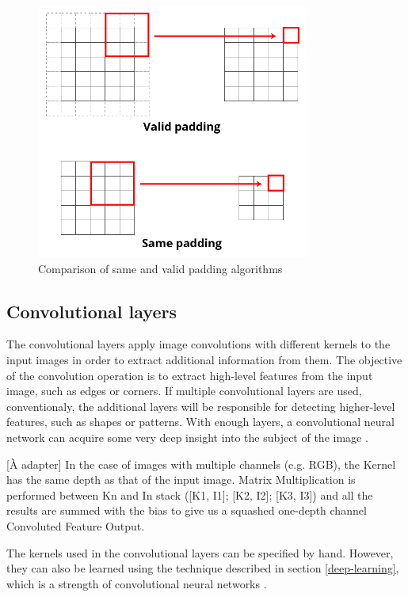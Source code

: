\documentclass[12pt,a4paper,notitlepage]{article}
\begin{document}
\begin{figure}[htbp]
	\centering
		\includegraphics[width=0.80\textwidth]{images/padding-illustration.png}
	\caption{Comparison of same and valid padding algorithms}
	\label{fig:padding-illustration}
\end{figure}

\subsection{Convolutional layers}\label{cnn-section}
The convolutional layers apply image convolutions with different kernels to the input images in order to extract additional information from them. The objective of the convolution operation is to extract high-level features from the input image, such as edges or corners. If multiple convolutional layers are used, conventionaly, the additional layers will be responsible for detecting higher-level features, such as shapes or patterns. With enough layers, a convolutional neural network can acquire some very deep insight into the subject of the image \cite{saha_comprehensive_2018}.

[À adapter] In the case of images with multiple channels (e.g. RGB), the Kernel has the same depth as that of the input image. Matrix Multiplication is performed between Kn and In stack ([K1, I1]; [K2, I2]; [K3, I3]) and all the results are summed with the bias to give us a squashed one-depth channel Convoluted Feature Output.

The kernels used in the convolutional layers can be specified by hand. However, they can also be learned using the technique described in section \ref{deep-learning}, which is a strength of convolutional neural networks \cite{brownlee_gentle_2019}.
\end{document}
